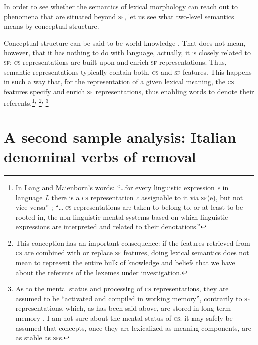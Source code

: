 \documentclass[output=paper]{langsci/langscibook}
\begin{document}
In order to see whether the semantics of lexical morphology can reach out to phenomena that are situated beyond \textsc{sf}, let us see what two-level semantics means by conceptual structure.

Conceptual structure can be said to be world knowledge %
\citep[711]{LangMaienborn2011}%
%
. That does not mean, however, that it has nothing to do with language, actually, it is closely related to \textsc{sf}: \textsc{cs} representations are built upon and enrich \textsc{sf} representations. Thus, semantic representations typically contain both, \textsc{cs} and \textsc{sf} features. This happens in such a way that, for the representation of a given lexical meaning, the \textsc{cs} features specify and enrich \textsc{sf} representations, thus enabling words to denote their referents.\footnote{In Lang and Maienborn's words: \enquote{\ldots{}for every linguistic expression \emph{e} in language \emph{L} there is a \textsc{cs} representation \emph{c} assignable to it via \textsc{sf}(e), but not vice versa} %
\citep[711]{LangMaienborn2011}%
%
; \enquote{\ldots{} \textsc{cs} representations are taken to belong to, or at least to be rooted in, the non-linguistic mental systems based on which linguistic expressions are interpreted and related to their denotations.}}\textsuperscript{,}%
\footnote{This conception has an important consequence: if the features retrieved from \textsc{cs} are combined with or replace \textsc{sf} features, doing lexical semantics does not mean to represent the entire bulk of knowledge and beliefs that we have about the referents of the lexemes under investigation.}\textsuperscript{,}%
\footnote{As to the mental status and processing of \textsc{cs} representations, they are assumed to be \enquote{activated and compiled in working memory}, contrarily to \textsc{sf} representations, which, as has been said above, are stored in long-term memory %
\citep[712]{LangMaienborn2011}%
%
. I am not sure about the mental status of \textsc{cs}: it may safely be assumed that concepts, once they are lexicalized as meaning components, are as stable as \textsc{sf}s.}

\section{A second sample analysis: Italian denominal verbs of removal}\label{a-second-sample-analysis-italian-denominal-verbs-of-removal}
\end{document}

